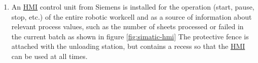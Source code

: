 \begin{enumerate}
    \item An \hyperref[acro:HMI]{HMI} control unit from Siemens is installed for the operation (start, pause, stop, etc.) of the entire robotic workcell and as
    a source of information about relevant process values, such as the number of sheets processed or failed in the current batch as shown in figure \ref{fig:simatic-hmi} The protective fence is attached with the unloading station, but contains a recess so that the \hyperref[acro:HMI]{HMI} can be used at all times.
\end{enumerate}
